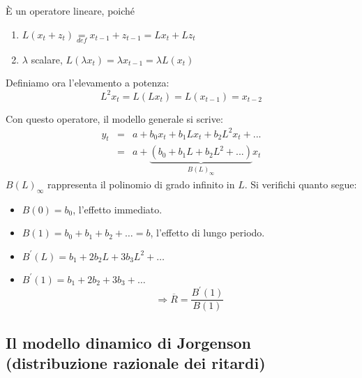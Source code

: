 \documentclass[a4paper]{report}
\newcounter{ese}
\newcounter{def}
\theoremstyle{remark}
\begin{document}
\`{E} un operatore lineare, poich\'{e}

\begin{enumerate}
\item $L(x_{t}+z_{t})\underset{def}{=}x_{t-1}+z_{t-1}=Lx_{t}+Lz_{t}$

\item $\lambda $ scalare, $L(\lambda x_{t})=\lambda x_{t-1}=\lambda L(x_{t})$
\end{enumerate}

\noindent Definiamo ora l'elevamento a potenza:%
\begin{equation*}
L^{2}x_{t}=L\left( Lx_{t}\right) =L\left( x_{t-1}\right) =x_{t-2}
\end{equation*}

Con questo operatore, il modello generale si scrive:%
\begin{eqnarray*}
y_{t} &=&a+b_{0}x_{t}+b_{1}Lx_{t}+b_{2}L^{2}x_{t}+... \\
&=&a+\underset{B(L)_{\infty }}{\underbrace{\left(
b_{0}+b_{1}L+b_{2}L^{2}+...\right) }}x_{t}
\end{eqnarray*}%
$B(L)_{\infty }$ rappresenta il polinomio di grado infinito in $L$. Si
verifichi quanto segue:

\begin{itemize}
\item $B(0)=b_{0}$, l'effetto immediato.

\item $B(1)=b_{0}+b_{1}+b_{2}+\ldots =b$, l'effetto di lungo periodo.

\item $B^{\prime }(L)=b_{1}+2b_{2}L+3b_{3}L^{2}+\ldots $

\item $B^{\prime }(1)=b_{1}+2b_{2}+3b_{3}+\ldots $%
\begin{equation*}
\Rightarrow \overline{R}=\frac{B^{\prime }(1)}{B(1)}
\end{equation*}
\end{itemize}

\subsection{Il modello dinamico di Jorgenson (distribuzione razionale dei
ritardi)}
\end{document}
